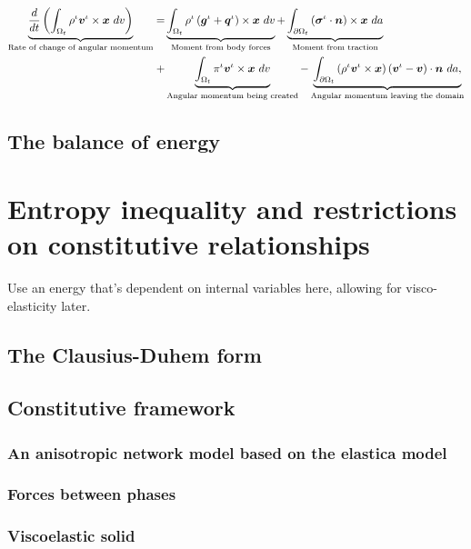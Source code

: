 \begin{equation}
\begin{split}
\underbrace{\frac{d}{dt}\left(\int_{\Omega_{t}} \rho^{\iota}
  \mbox{\boldmath$ v$}^{\iota} \times \mbox{\boldmath$ x$}\ dv\right)}_{\text{Rate of change of angular  momentum}}  = 
& \underbrace{\int_{\Omega_{t}} \rho^{\iota} \left(\mbox{\boldmath$ g$}^{\iota} +
  \mbox{\boldmath$ q$}^{\iota}\right) \times \mbox{\boldmath$ x$}\ dv}_{\text{Moment from body forces}} 
+ \underbrace{\int_{\partial \Omega_{t}}
  \left(\mbox{\boldmath$\sigma$}^{\iota}\cdot\mbox{\boldmath$ n$}\right) \times \mbox{\boldmath$ x$}\ da}_{\text{Moment from traction}}\\ 
+ & \underbrace{\int_{\Omega_{t}} \pi^{\iota}\mbox{\boldmath$ v$}^{\iota} \times
  \mbox{\boldmath$ x$}\ dv}_{\text{Angular momentum being created}} 
- \underbrace{\int_{\partial \Omega_{t}} \left(\rho^{\iota}
  \mbox{\boldmath$ v$}^{\iota}  \times \mbox{\boldmath$ x$}\right) \left(\mbox{\boldmath$ v$}^{\iota} -
\mbox{\boldmath$ v$}\right) \cdot \mbox{\boldmath$ n$}\ da,}_{\text{Angular momentum leaving the domain}} 
\end{split}
\label{globalbalanceofangularmomentum}
\end{equation}

\subsection{The balance of energy}
\label{eu-balance-of-energy}

\section{Entropy inequality and restrictions on constitutive relationships}
Use an energy that's dependent on internal variables here, allowing for visco-elasticity later.
\subsection{The Clausius-Duhem form}
\subsection{Constitutive framework}
\subsubsection{An anisotropic network model based on the elastica
  model}
\subsubsection{Forces between phases}
\subsubsection{Viscoelastic solid}
